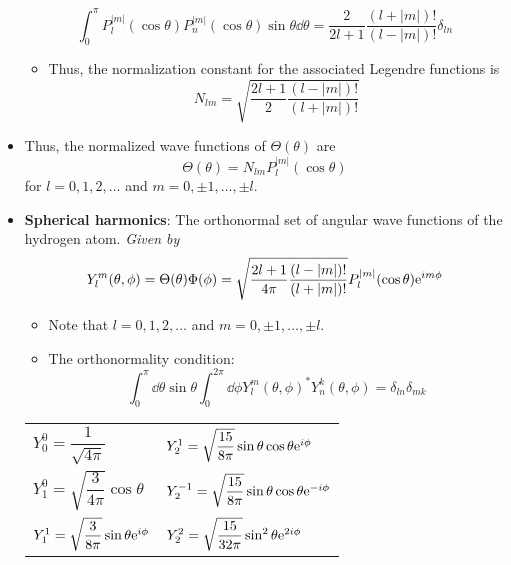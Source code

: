 \documentclass[../notes.tex]{subfiles}
\begin{document}
\begin{itemize}
\begin{equation*}
        \int_0^\pi P_l^{|m|}(\cos\theta)P_n^{|m|}(\cos\theta)\sin\theta\dd{\theta} = \frac{2}{2l+1}\frac{(l+|m|)!}{(l-|m|)!}\delta_{ln}
    \end{equation*}
    \begin{itemize}
        \item Thus, the normalization constant for the associated Legendre functions is
        \begin{equation*}
            N_{lm} = \sqrt{\frac{2l+1}{2}\frac{(l-|m|)!}{(l+|m|)!}}
        \end{equation*}
    \end{itemize}
    \item Thus, the normalized wave functions of $\Theta(\theta)$ are
    \begin{equation*}
        \Theta(\theta) = N_{lm}P_l^{|m|}(\cos\theta)
    \end{equation*}
    for $l=0,1,2,\dots$ and $m=0,\pm 1,\dots,\pm l$.
    \item \textbf{Spherical harmonics}: The orthonormal set of angular wave functions of the hydrogen atom. \emph{Given by}
    \begin{equation*}
        Y_l^m(\theta,\phi) = \Theta(\theta)\Phi(\phi)
        = \sqrt{\frac{2l+1}{4\pi}\frac{(l-|m|)!}{(l+|m|)!}}P_l^{|m|}(\cos\theta)\e[im\phi]
    \end{equation*}
    \begin{itemize}
        \item Note that $l=0,1,2,\dots$ and $m=0,\pm 1,\dots,\pm l$.
        \item The orthonormality condition:
        \begin{equation*}
            \int_0^\pi\dd{\theta}\sin\theta\int_0^{2\pi}\dd{\phi}Y_l^m(\theta,\phi)^*Y_n^k(\theta,\phi) = \delta_{ln}\delta_{mk}
        \end{equation*}
    \end{itemize}
    \begin{table}[h!]
        \centering
        \small
        \renewcommand{\arraystretch}{2.5}
        \begin{tabular}{ll}
            \toprule
            $Y_0^0=\dfrac{1}{\sqrt{4\pi}}$ & $Y_2^1=\sqrt{\dfrac{15}{8\pi}}\sin\theta\cos\theta\e[i\phi]$\\
            $Y_1^0=\sqrt{\dfrac{3}{4\pi}}\cos\theta$ & $Y_2^{-1}=\sqrt{\dfrac{15}{8\pi}}\sin\theta\cos\theta\e[-i\phi]$\\
            $Y_1^1=\sqrt{\dfrac{3}{8\pi}}\sin\theta\e[i\phi]$ & $Y_2^2=\sqrt{\dfrac{15}{32\pi}}\sin^2\theta\e[2i\phi]$\\

\end{tabular}
\end{table}
\end{itemize}
\end{document}

